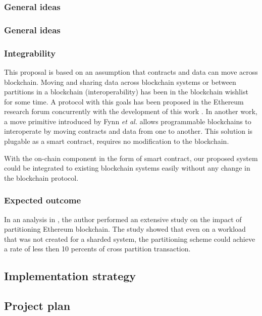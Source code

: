 \subsubsection{General ideas}

\subsubsection{General ideas}

\subsubsection{Integrability}
This proposal is based on an assumption that contracts and data can move across
blockchain. Moving and sharing data across blockchain systems or between
partitions in a blockchain (interoperability) has been in the blockchain
wishlist for some time. A protocol with this goals has been proposed in the
Ethereum research forum concurrently with the development of this work
\cite{buterin2018yanking}. In another work, a move primitive introduced by Fynn \emph{et al.}
\cite{fynn2020move} allows programmable blockchains to interoperate by moving
contracts and data from one to another. This solution is plugable as a smart
contract, requires no modification to the blockchain. 

With the on-chain component in the form of smart contract, our proposed system
could be integrated to existing blockchain systems easily without any change in
the blockchain protocol. 

\subsubsection{Expected outcome}

In an analysis in \cite{fynn2020move}, the author performed an extensive study
on the impact of partitioning Ethereum blockchain. The study showed that even on
a workload that was not created for a sharded system, the partitioning scheme
could achieve a rate of less then 10 percents of cross partition transaction. 


\subsection{Implementation strategy}

\subsection{Project plan}

